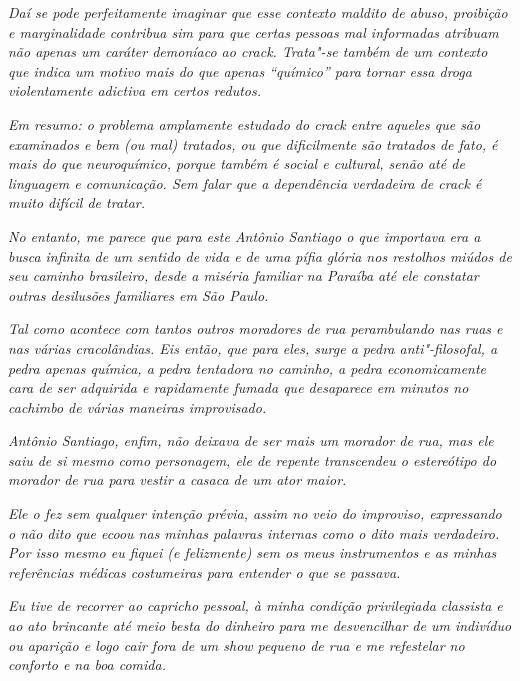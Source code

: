 \emph{Daí se pode perfeitamente imaginar que esse contexto maldito de
abuso, proibição e marginalidade contribua sim para que certas pessoas
mal informadas atribuam não apenas um caráter demoníaco ao crack.
Trata"-se também de um contexto que indica um motivo mais do que apenas
``químico'' para tornar essa droga violentamente adictiva em certos
redutos.}

\emph{Em resumo: o problema amplamente estudado do crack entre aqueles
que são examinados e bem (ou mal) tratados, ou que dificilmente são
tratados de fato, é mais do que neuroquímico, porque também é social e
cultural, senão até de linguagem e comunicação. Sem falar que a
dependência verdadeira de crack é muito difícil de tratar.}

\emph{No entanto, me parece que para este Antônio Santiago o que
importava era a busca infinita de um sentido de vida e de uma pífia
glória nos restolhos miúdos de seu caminho brasileiro, desde a miséria
familiar na Paraíba até ele constatar outras desilusões familiares em
São Paulo.}

\emph{Tal como acontece com tantos outros moradores de rua perambulando
nas ruas e nas várias cracolândias. Eis então, que para eles, surge a
pedra anti"-filosofal, a pedra apenas química, a pedra tentadora no
caminho, a pedra economicamente cara de ser adquirida e rapidamente
fumada que desaparece em minutos no cachimbo de várias maneiras
improvisado.}

\emph{Antônio Santiago, enfim, não deixava de ser mais um morador de
rua, mas ele saiu de si mesmo como personagem, ele de repente
transcendeu o estereótipo do morador de rua para vestir a casaca de um
ator maior.}

\emph{Ele o fez sem qualquer intenção prévia, assim no veio do
improviso, expressando o não dito que ecoou nas minhas palavras internas
como o dito mais verdadeiro. Por isso mesmo eu fiquei (e felizmente) sem
os meus instrumentos e as minhas referências médicas costumeiras para
entender o que se passava.}

\emph{Eu tive de recorrer ao capricho pessoal, à minha condição
privilegiada classista e ao ato brincante até meio besta do dinheiro
para me desvencilhar de um indivíduo ou aparição e logo cair fora de um
show pequeno de rua e me refestelar no conforto e na boa comida.~}

